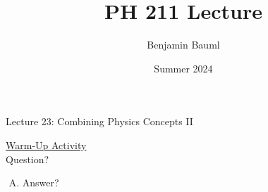 \documentclass[]{article}
\title{PH 211 Lecture \Week}
\author{Benjamin Bauml}
\date{Summer 2024}
\newcommand{\Week}{23}
\begin{document}
\begin{TeacherMargin}

\end{TeacherMargin}
\begin{PresentSpace}
\begin{center}
	\huge Lecture \Week: Combining Physics Concepts II
\end{center}
\vspace{0.5cm}
\underline{Warm-Up Activity} \\
Question?
\begin{enumerate}[(A)]
	\item Answer?
\end{enumerate}
\end{PresentSpace}
\newpage
\end{document}
